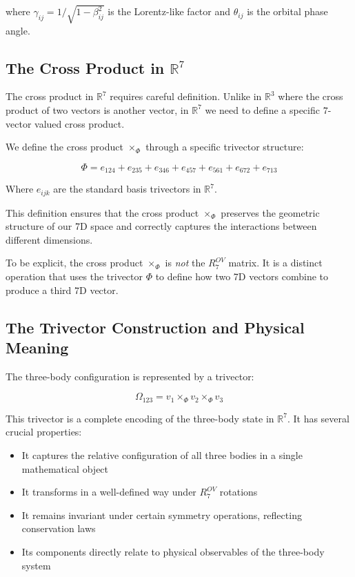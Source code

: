\documentclass{article}
\begin{document}
where $\gamma_{ij} = 1/\sqrt{1-\beta_{ij}^2}$ is the Lorentz-like factor and $\theta_{ij}$ is the orbital phase angle.

\subsection{The Cross Product in $\mathbb{R}^7$}

The cross product in $\mathbb{R}^7$ requires careful definition. Unlike in $\mathbb{R}^3$ where the cross product of two vectors is another vector, in $\mathbb{R}^7$ we need to define a specific $7$-vector valued cross product.

We define the cross product $\times_\Phi$ through a specific trivector structure:

\begin{equation}
\Phi = e_{124} + e_{235} + e_{346} + e_{457} + e_{561} + e_{672} + e_{713}
\end{equation}

Where $e_{ijk}$ are the standard basis trivectors in $\mathbb{R}^7$.

This definition ensures that the cross product $\times_\Phi$ preserves the geometric structure of our 7D space and correctly captures the interactions between different dimensions.

To be explicit, the cross product $\times_\Phi$ is \textit{not} the $R^{OV}_7$ matrix. It is a distinct operation that uses the trivector $\Phi$ to define how two 7D vectors combine to produce a third 7D vector.

\subsection{The Trivector Construction and Physical Meaning}

The three-body configuration is represented by a trivector:

\begin{equation}
\Omega_{123} = v_1 \times_\Phi v_2 \times_\Phi v_3
\end{equation}

This trivector is a complete encoding of the three-body state in $\mathbb{R}^7$. It has several crucial properties:

\begin{itemize}
\item It captures the relative configuration of all three bodies in a single mathematical object
\item It transforms in a well-defined way under $R^{OV}_7$ rotations
\item It remains invariant under certain symmetry operations, reflecting conservation laws
\item Its components directly relate to physical observables of the three-body system
\end{itemize}
\end{document}
